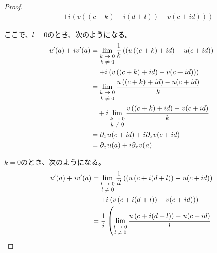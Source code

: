 \documentclass[dvipdfmx]{jsarticle}
\begin{document}
\begin{proof}
\begin{align*}
&\quad \left. + i\left( v\left( (c + k) + i(d + l) \right) - v(c + id) \right) \right)
\end{align*}\par
ここで、$l = 0$のとき、次のようになる。
\begin{align*}
u'(a) + iv'(a) &= \lim_{\scriptsize \begin{matrix}
k \rightarrow 0 \\
k \neq 0 \\
\end{matrix}}\frac{1}{k}\left( \left( u\left( (c + k) + id \right) - u(c + id) \right) \right. \\
&\quad \left. + i\left( v\left( (c + k) + id \right) - v(c + id) \right) \right)\\
&= \lim_{\scriptsize \begin{matrix}
k \rightarrow 0 \\
k \neq 0 \\
\end{matrix}}\frac{u\left( (c + k) + id \right) - u(c + id)}{k} \\
&\quad + i\lim_{\scriptsize \begin{matrix}
k \rightarrow 0 \\
k \neq 0 \\
\end{matrix}}\frac{v\left( (c + k) + id \right) - v(c + id)}{k}\\
&= \partial_{x}u(c + id) + i\partial_{x}v(c + id)\\
&= \partial_{x}u(a) + i\partial_{x}v(a)
\end{align*}\par
$k = 0$のとき、次のようになる。
\begin{align*}
u'(a) + iv'(a) &= \lim_{\scriptsize \begin{matrix}
l \rightarrow 0 \\
l \neq 0 \\
\end{matrix}}\frac{1}{il}\left( \left( u\left( c + i(d + l) \right) - u(c + id) \right) \right. \\
&\quad \left. + i\left( v\left( c + i(d + l) \right) - v(c + id) \right) \right)\\
&= \frac{1}{i}\left( \lim_{\scriptsize \begin{matrix}
l \rightarrow 0 \\
l \neq 0 \\
\end{matrix}}\frac{u\left( c + i(d + l) \right) - u(c + id)}{l} \right. \\

\end{align*}
\end{proof}
\end{document}

